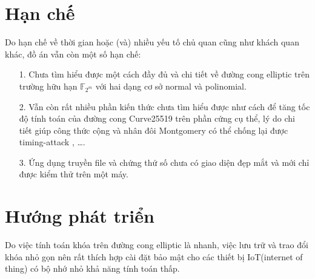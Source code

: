 \documentclass[a4paper,12pt]{report}
\begin{document}
\section*{Hạn chế}
Do hạn chế về thời gian hoặc (và) nhiều yếu tố chủ quan cũng như khách quan khác, đồ án vẫn còn một số hạn chế:
\begin{itemize}
\item[1. ] Chưa tìm hiểu được một cách đầy đủ và chi tiết về đường cong elliptic trên trường hữu hạn $\mathbb{F}_{2^m}$ với hai dạng cơ sở normal và polinomial.
\item[2. ] Vẫn còn rất nhiều phần kiến thức chưa tìm hiểu được như cách để tăng tốc độ tính toán của đường cong Curve25519 trên phần cứng cụ thể, lý do chi tiết giúp công thức cộng và nhân đôi Montgomery có thể chống lại được timing-attack , \ldots.
\item[3. ] Ứng dụng truyền file và chứng thứ số chưa có giao diện đẹp mắt và mới chỉ được kiểm thử trên một máy.
\end{itemize}
\section*{Hướng phát triển}
Do việc tính toán khóa trên đường cong elliptic là nhanh, việc lưu trữ và trao đổi khóa nhỏ gọn nên rất thích hợp cài đặt bảo mật cho các thiết bị IoT(internet of thing) có bộ nhớ nhỏ khả năng tính toán thấp.
\end{document}
